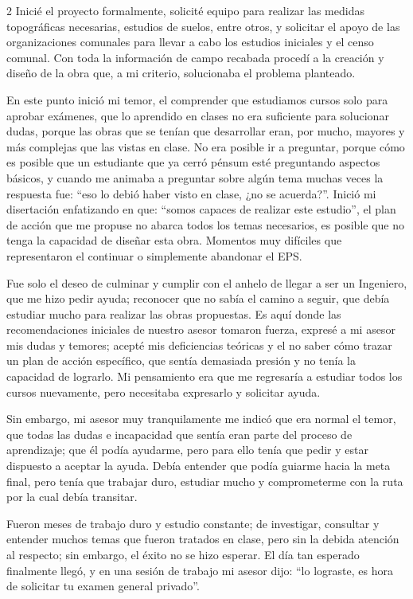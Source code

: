 \documentclass[12pt,spanish,Letterpaper,openany]{book}
\begin{document}
\begin {multicols}{2}
Inicié el proyecto formalmente, solicité equipo para realizar las medidas topográficas necesarias, estudios de suelos, entre otros, y solicitar el apoyo de las organizaciones comunales para llevar a cabo los estudios iniciales y el censo comunal. Con toda la información de campo recabada procedí a la creación y diseño de la obra que, a mi criterio, solucionaba el problema planteado.

En este punto inició mi temor, el comprender que estudiamos cursos solo para aprobar exámenes, que lo aprendido en clases no era suficiente para solucionar dudas, porque las obras que se tenían que desarrollar eran, por mucho, mayores y más complejas que las vistas en clase. No era posible ir a preguntar, porque cómo es posible que un estudiante que ya cerró pénsum esté preguntando aspectos básicos, y cuando me animaba a preguntar sobre algún tema muchas veces la respuesta fue: ``eso lo debió haber visto en clase, ¿no se acuerda?''. Inició mi disertación enfatizando en que: ``somos capaces de realizar este estudio'', el plan de acción que me propuse no abarca todos los temas necesarios, es posible que no tenga la capacidad de diseñar esta obra. Momentos muy difíciles que representaron el continuar o simplemente abandonar el EPS.

Fue solo el deseo de culminar y cumplir con el anhelo de llegar a ser un Ingeniero, que me hizo pedir ayuda; reconocer que no sabía el camino a seguir, que debía estudiar mucho para realizar las obras propuestas. Es aquí donde las recomendaciones iniciales de nuestro asesor tomaron fuerza, expresé a mi asesor mis dudas y temores; acepté mis deficiencias teóricas y el no saber cómo trazar un plan de acción específico, que sentía demasiada presión y no tenía la capacidad de lograrlo. Mi pensamiento era que me regresaría a estudiar todos los cursos nuevamente, pero necesitaba expresarlo y solicitar ayuda.

Sin embargo, mi asesor muy tranquilamente me indicó que era normal el temor, que todas las dudas e incapacidad que sentía eran parte del proceso de aprendizaje; que él podía ayudarme, pero para ello tenía que pedir y estar dispuesto a aceptar la ayuda. Debía entender que podía guiarme hacia la meta final, pero tenía que trabajar duro, estudiar mucho y comprometerme con la ruta por la cual debía transitar.

Fueron meses de trabajo duro y estudio constante; de investigar, consultar y entender muchos temas que fueron tratados en clase, pero sin la debida atención al respecto; sin embargo, el éxito no se hizo esperar. El día tan esperado finalmente llegó, y en una sesión de trabajo mi asesor dijo: ``lo lograste, es hora de solicitar tu examen general privado''.


\end{multicols}
\end{document}
